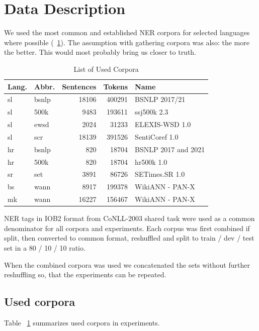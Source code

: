 \documentclass[sigconf]{acmart}
\begin{document}
\section{Data Description}
We used the most common and established NER corpora for selected languages where possible (~\ref{tab:corpora}).
The assumption with gathering corpora was also: the more the better.
This would most probably bring us closer to truth.
\begin{table}[H]
  \caption{List of Used Corpora}
  \label{tab:corpora}
  \begin{tabular}{llrrl}
    \toprule
    Lang.&Abbr.&Sentences&Tokens&Name\\
    \midrule
    sl&bsnlp&18106&400291&BSNLP 2017/21\cite{piskorski-etal-2021-slav}\\
    sl&500k&9483&193611&ssj500k 2.3\cite{ssj500k-23}\\
    sl&ewsd&2024&31233&{ELEXIS}-{WSD} 1.0\cite{ELEXIS-WSD-10}\\
    sl&scr&18139&391526&{SentiCoref} 1.0\cite{SentiCoref-10}\\
    \midrule
    hr&bsnlp&820&18704&BSNLP 2017 and 2021\cite{piskorski-etal-2021-slav}\\
    hr&500k&820&18704&hr500k 1.0\cite{hr500k-10}\\
    \midrule
    sr&set&3891&86726&{SETimes}.{SR} 1.0\cite{SETimes-SR-1.0}\\
    \midrule
    bs&wann&8917&199378&WikiANN - PAN-X\cite{rahimi-etal-2019-massively}\\
    \midrule
    mk&wann&16227&156467&WikiANN - PAN-X\cite{rahimi-etal-2019-massively}\\
  \bottomrule
  \end{tabular}
\end{table}
NER tags in IOB2\cite{IOB2} format from CoNLL-2003 shared task\cite{CoNLL2003} were used as a common denominator for all corpora and experiments.
Each corpus was first combined if split, then converted to common format, reshuffled and split to train / dev / test set in a 80 / 10 / 10 ratio.

When the combined corpora was used we concatenated the sets without further reshuffling so, that the experiments can be repeated.
\subsection{Used corpora}
Table ~\ref{tab:corpora} summarizes used corpora in experiments.
\end{document}
